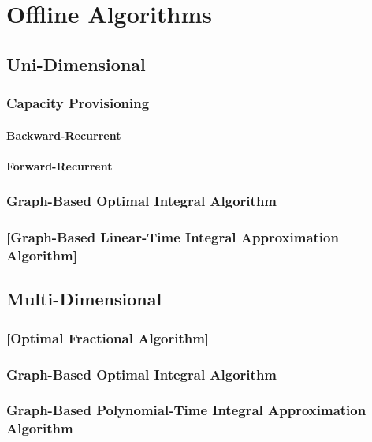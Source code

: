 
\chapter{Offline Algorithms}\label{chapter:algorithms}

\section{Uni-Dimensional}

\subsection{Capacity Provisioning}

\subsubsection{Backward-Recurrent}

\subsubsection{Forward-Recurrent}

\subsection{Graph-Based Optimal Integral Algorithm}

\subsection{[Graph-Based Linear-Time Integral Approximation Algorithm]}

\section{Multi-Dimensional}

\subsection{[Optimal Fractional Algorithm]}

\subsection{Graph-Based Optimal Integral Algorithm}

\subsection{Graph-Based Polynomial-Time Integral Approximation Algorithm}
